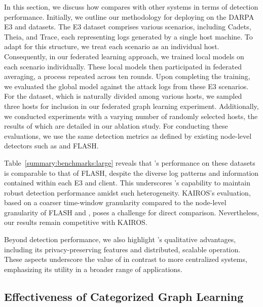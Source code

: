 In this section, we discuss how \Sys compares with other systems in terms of detection performance. Initially, we outline our methodology for deploying \Sys on the DARPA E3 and \optc datasets. The E3 dataset comprises various scenarios, including Cadets, Theia, and Trace, each representing logs generated by a single host machine. To adapt \Sys for this structure, we treat each scenario as an individual host. Consequently, in our federated learning approach, we trained local \gnnshort models on each scenario individually. These local models then participated in federated averaging, a process repeated across ten rounds. Upon completing the training, we evaluated the global \gnnshort model against the attack logs from these E3 scenarios. For the \optc dataset, which is naturally divided among various hosts, we sampled three hosts for inclusion in our federated graph learning experiment. Additionally, we conducted experiments with a varying number of randomly selected hosts, the results of which are detailed in our ablation study. For conducting these evaluations, we use the same detection metrics as defined by existing node-level detectors such as \threatrace and FLASH.

Table~\ref{summary:benchmarks:large} reveals that \Sys's performance on these datasets is comparable to that of FLASH, despite the diverse log patterns and information contained within each E3 and \optc client. This underscores \Sys's capability to maintain robust detection performance amidst such heterogeneity. KAIROS's evaluation, based on a coarser time-window granularity compared to the node-level granularity of FLASH and \Sys, poses a challenge for direct comparison. Nevertheless, our results remain competitive with KAIROS.

Beyond detection performance, we also highlight \Sys's qualitative advantages, including its privacy-preserving features and distributed, scalable operation. These aspects underscore the value of \Sys in contrast to more centralized systems, emphasizing its utility in a broader range of applications.

\subsection{Effectiveness of Categorized Graph Learning}

